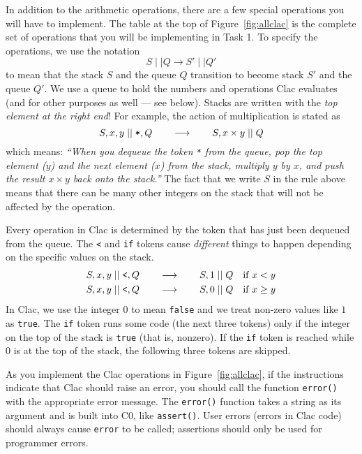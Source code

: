 \documentclass[12pt]{exam}
\begin{document}
\newpage


In addition to the arithmetic operations, there are a few special
operations you will have to implement.  The table at the top of
Figure~\ref{fig:allclac} is the complete set of operations that you
will be implementing in Task 1.  To specify the operations, we use the
notation
$$
S \mid\mid Q \longrightarrow S' \mid\mid Q'
$$
to mean that the stack $S$ and the queue $Q$ transition to become
stack $S'$ and the queue $Q'$.  We use a queue to hold the numbers and
operations Clac evaluates (and for other purposes as well --- see
below).  Stacks are written with the \emph{top element at the right
  end}!  For example, the action of multiplication is stated as
$$
S, x, y \mid\mid \mbox{\texttt{*}}, Q
\qquad\longrightarrow\qquad
S, x \times y \mid\mid Q
$$
which means: \emph{``When you dequeue the token \texttt{*} from the
  queue, pop the top element ($y$) and the next element ($x$) from the
  stack, multiply $y$ by $x$, and push the result $x \times y$ back onto
  the stack.''} The fact that we write $S$ in the rule above means
that there can be many other integers on the stack that will not be
affected by the operation.

Every operation in Clac is determined by the token that has just been dequeued
from the queue. The \lstinline'<' and \lstinline[language={[clac]C}]'if'
tokens cause \emph{different} things to happen depending on the specific
values on the stack.
\begin{align*}
S, x, y \mid\mid \mbox{\texttt{<}}, Q \qquad\longrightarrow\qquad
S, 1 \mid\mid Q & & \mbox{if $x < y$}
\\
S, x, y \mid\mid \mbox{\texttt{<}}, Q \qquad\longrightarrow\qquad
S, 0 \mid\mid Q & & \mbox{if $x \geq y$}
\end{align*}
In Clac, we use the integer $0$ to mean \lstinline'false' and we treat
non-zero values like $1$ as \lstinline'true'. The
\lstinline[language={[clac]C}]'if' token runs some code (the next
three tokens) only if the integer on the top of the stack is
\lstinline'true' (that is, nonzero). If the
\lstinline[language={[clac]C}]'if' token is reached while 0 is at the
top of the stack, the following three tokens are skipped.

As you implement the Clac operations in Figure~\ref{fig:allclac}, if
the instructions indicate that Clac should raise an error, you should
call the function \lstinline'error()' with the appropriate error
message.  The \lstinline'error()' function takes a string as its
argument and is built into C0, like \lstinline'assert()'.  User
errors (errors in Clac code) should always cause \lstinline'error' to
be called; assertions should only be used for programmer errors.
\end{document}

